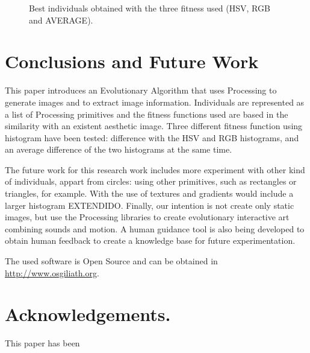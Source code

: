 \documentclass[conference]{IEEEtran}
\begin{document}
\begin{figure}[ht]
{   \label{fig:subfig2}
 }
\label{fig:bestinds}
\caption{Best individuals obtained with the three fitness used (HSV, RGB and AVERAGE). }
\end{figure}


\section{Conclusions and Future Work}
\label{sec:conclusions}
This paper introduces an Evolutionary Algorithm that uses Processing to generate images and to extract image information. Individuals are represented as a list of Processing primitives and the fitness functions used are based in the similarity with an existent aesthetic image. Three different fitness function using histogram have been tested: difference with the HSV and RGB histograms, and an average difference of the two histograms at the same time.

The future work for this research work includes more experiment with other kind of individuals, appart from circles: using other primitives, such as rectangles or triangles, for example. With the use of textures and gradients would include a larger histogram EXTENDIDO. Finally, our intention is not create only static images, but use the Processing libraries to create evolutionary interactive art combining sounds and motion. A human guidance tool is also being developed to obtain human feedback to create a knowledge base for future experimentation.

The used software is Open Source and can be obtained in \url{http://www.osgiliath.org}.

\section*{Acknowledgements.} 
This paper has been 



\end{document}
